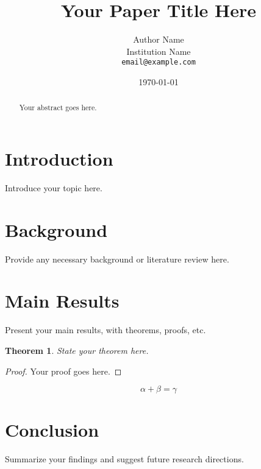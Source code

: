 \documentclass[12pt]{article}
\title{Your Paper Title Here}
\author{Author Name\\
\small Institution Name\\
\small \texttt{email@example.com}
}
\date{\today}
\theoremstyle{definition}
\theoremstyle{remark}
\theoremstyle{plain}
\newtheorem{theorem}{Theorem}[section]
\begin{document}
\maketitle

\begin{abstract}
Your abstract goes here.
\end{abstract}

\section{Introduction}
Introduce your topic here.

\section{Background}
Provide any necessary background or literature review here.

\section{Main Results}
Present your main results, with theorems, proofs, etc.

\begin{theorem}
State your theorem here.
\end{theorem}

\begin{proof}
Your proof goes here.
\end{proof}

\begin{equation}
    \alpha + \beta = \gamma
\end{equation}

\section{Conclusion}
Summarize your findings and suggest future research directions.



\end{document}
